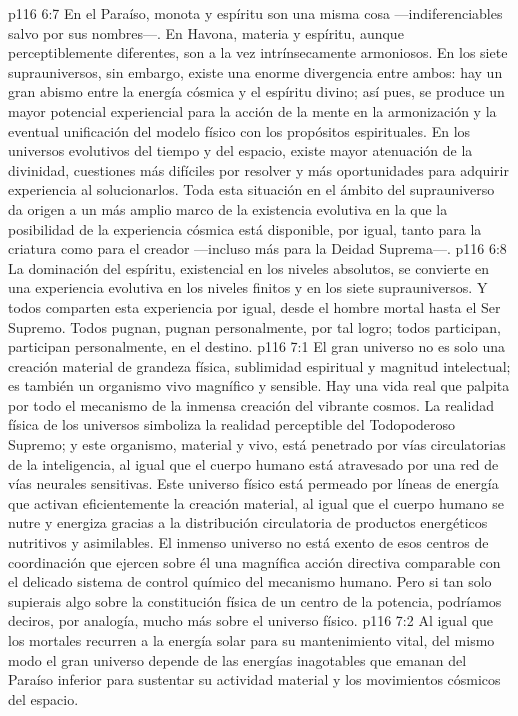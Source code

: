 \vs p116 6:7 En el Paraíso, monota y espíritu son una misma cosa ---indiferenciables salvo por sus nombres---. En Havona, materia y espíritu, aunque perceptiblemente diferentes, son a la vez intrínsecamente armoniosos. En los siete suprauniversos, sin embargo, existe una enorme divergencia entre ambos: hay un gran abismo entre la energía cósmica y el espíritu divino; así pues, se produce un mayor potencial experiencial para la acción de la mente en la armonización y la eventual unificación del modelo físico con los propósitos espirituales. En los universos evolutivos del tiempo y del espacio, existe mayor atenuación de la divinidad, cuestiones más difíciles por resolver y más oportunidades para adquirir experiencia al solucionarlos. Toda esta situación en el ámbito del suprauniverso da origen a un más amplio marco de la existencia evolutiva en la que la posibilidad de la experiencia cósmica está disponible, por igual, tanto para la criatura como para el creador ---incluso más para la Deidad Suprema---.
\vs p116 6:8 La dominación del espíritu, existencial en los niveles absolutos, se convierte en una experiencia evolutiva en los niveles finitos y en los siete suprauniversos. Y todos comparten esta experiencia por igual, desde el hombre mortal hasta el Ser Supremo. Todos pugnan, pugnan personalmente, por tal logro; todos participan, participan personalmente, en el destino.
\vs p116 7:1 El gran universo no es solo una creación material de grandeza física, sublimidad espiritual y magnitud intelectual; es también un organismo vivo magnífico y sensible. Hay una vida real que palpita por todo el mecanismo de la inmensa creación del vibrante cosmos. La realidad física de los universos simboliza la realidad perceptible del Todopoderoso Supremo; y este organismo, material y vivo, está penetrado por vías circulatorias de la inteligencia, al igual que el cuerpo humano está atravesado por una red de vías neurales sensitivas. Este universo físico está permeado por líneas de energía que activan eficientemente la creación material, al igual que el cuerpo humano se nutre y energiza gracias a la distribución circulatoria de productos energéticos nutritivos y asimilables. El inmenso universo no está exento de esos centros de coordinación que ejercen sobre él una magnífica acción directiva comparable con el delicado sistema de control químico del mecanismo humano. Pero si tan solo supierais algo sobre la constitución física de un centro de la potencia, podríamos deciros, por analogía, mucho más sobre el universo físico.
\vs p116 7:2 Al igual que los mortales recurren a la energía solar para su mantenimiento vital, del mismo modo el gran universo depende de las energías inagotables que emanan del Paraíso inferior para sustentar su actividad material y los movimientos cósmicos del espacio.
